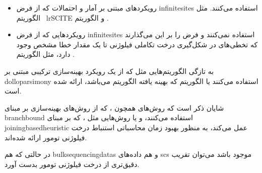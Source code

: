  \begin{itemize}
 	\item رویکردهای مبتنی بر آمار و احتمالات که از فرض \gls{infinitesites}  استفاده می‌کنند. مثل الگوریتم \ lr{SCITE}  \cite{jahn2016tree} و الگوریتم   \cite{ross2016onconem}. 
\item رویکردهایی که از فرض \gls{infinitesites} استفاده نمی‌کنند و فرض را بر این می‌گذارند که تخطی‌های در شکل‌گیری درخت تکاملی فیلوژنی تا یک مقدار خطا مشخص وجود دارد، مثل الگوریتم  \cite{zafar2017sifit}.  
 \end{itemize}


به تازگی الگوریتم‌هایی مثل  که از یک رویکرد بهینه‌سازی ترکیبی مبتنی بر \gls{dolloparsimony} استفاده می‌کنند یا الگوریتم   که بهینه یافته الگوریتم  می‌باشد، ارائه شده است. \cite{el2018sphyr, zafar2019siclonefit}

 

شایان ذکر است که روش‌های همچون  ، که از روش‌های بهینه‌سازی بر مبنای \gls{branchbound} استفاده می‌کنند، و یا روش‌هایی مثل ، که بر مبنای \gls{joiningbasedheuristic} عمل می‌کند، به منظور بهبود زمان محاسباتی استنباط درخت فیلوژنی تومور ارائه شده‌اند. \cite{sadeqi2020phiscs, wu2020accurate}

در حالتی که هم \glspl{bulksequencingdata} و هم داده‌های \gls{scs} موجود باشد می‌توان تقریب دقیق‌تری از درخت فیلوژنی  تومور بدست آورد. \cite{malikic2019integrative, malikic2019phiscs}


